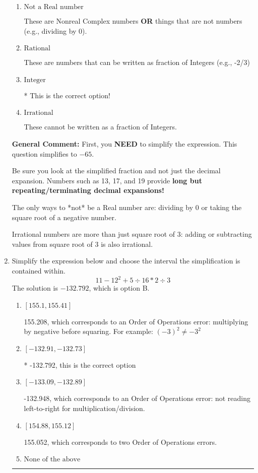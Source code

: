 \documentclass{extbook}[14pt]
\newcommand{\litem}[1]{\item #1

\rule{\textwidth}{0.4pt}}
\begin{document}
\begin{enumerate}
{\begin{enumerate}[label=\Alph*.]
These are the counting numbers with 0 (0, 1, 2, 3, ...)
\item \( \text{Not a Real number} \)

These are Nonreal Complex numbers \textbf{OR} things that are not numbers (e.g., dividing by 0).
\item \( \text{Rational} \)

These are numbers that can be written as fraction of Integers (e.g., -2/3)
\item \( \text{Integer} \)

* This is the correct option!
\item \( \text{Irrational} \)

These cannot be written as a fraction of Integers.
\end{enumerate}

\textbf{General Comment:} First, you \textbf{NEED} to simplify the expression. This question simplifies to $-65$. 
 
 Be sure you look at the simplified fraction and not just the decimal expansion. Numbers such as 13, 17, and 19 provide \textbf{long but repeating/terminating decimal expansions!} 
 
 The only ways to *not* be a Real number are: dividing by 0 or taking the square root of a negative number. 
 
 Irrational numbers are more than just square root of 3: adding or subtracting values from square root of 3 is also irrational.
}
\litem{
Simplify the expression below and choose the interval the simplification is contained within.
\[ 11 - 12^2 + 5 \div 16 * 2 \div 3 \]The solution is \( -132.792 \), which is option B.\begin{enumerate}[label=\Alph*.]
\item \( [155.1, 155.41] \)

 155.208, which corresponds to an Order of Operations error: multiplying by negative before squaring. For example: $(-3)^2 \neq -3^2$
\item \( [-132.91, -132.73] \)

* -132.792, this is the correct option
\item \( [-133.09, -132.89] \)

 -132.948, which corresponds to an Order of Operations error: not reading left-to-right for multiplication/division.
\item \( [154.88, 155.12] \)

 155.052, which corresponds to two Order of Operations errors.
\item \( \text{None of the above} \)


\end{enumerate}}
\end{enumerate}
\end{document}
